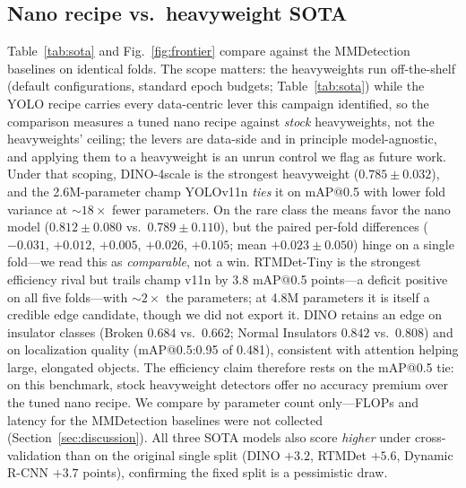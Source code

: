 \documentclass[conference]{IEEEtran}
\makeatletter
\newcommand{\map}{mAP@0.5}
\makeatother
\begin{document}
\subsection{Nano recipe vs.\ heavyweight SOTA}
\label{sec:sota}
Table~\ref{tab:sota} and Fig.~\ref{fig:frontier} compare against the MMDetection baselines on identical folds. The scope matters: the heavyweights run off-the-shelf (default configurations, standard epoch budgets; Table~\ref{tab:sota}) while the YOLO recipe carries every data-centric lever this campaign identified, so the comparison measures a tuned nano recipe against \emph{stock} heavyweights, not the heavyweights' ceiling; the levers are data-side and in principle model-agnostic, and applying them to a heavyweight is an unrun control we flag as future work. Under that scoping, DINO-4scale is the strongest heavyweight ($0.785\pm0.032$), and the 2.6M-parameter champ YOLOv11n \emph{ties} it on \map{} with lower fold variance at ${\sim}18\times$ fewer parameters. On the rare class the means favor the nano model ($0.812\pm0.080$ vs.\ $0.789\pm0.110$), but the paired per-fold differences ($-0.031$, $+0.012$, $+0.005$, $+0.026$, $+0.105$; mean $+0.023\pm0.050$) hinge on a single fold---we read this as \emph{comparable}, not a win. RTMDet-Tiny is the strongest efficiency rival but trails champ v11n by 3.8 \map{} points---a deficit positive on all five folds---with ${\sim}2\times$ the parameters; at 4.8M parameters it is itself a credible edge candidate, though we did not export it. DINO retains an edge on insulator classes (Broken $0.684$ vs.\ $0.662$; Normal Insulators $0.842$ vs.\ $0.808$) and on localization quality (mAP@0.5:0.95 of 0.481), consistent with attention helping large, elongated objects. The efficiency claim therefore rests on the \map{} tie: on this benchmark, stock heavyweight detectors offer no accuracy premium over the tuned nano recipe. We compare by parameter count only---FLOPs and latency for the MMDetection baselines were not collected (Section~\ref{sec:discussion}). All three SOTA models also score \emph{higher} under cross-validation than on the original single split (DINO $+3.2$, RTMDet $+5.6$, Dynamic R-CNN $+3.7$ points), confirming the fixed split is a pessimistic draw.
\end{document}
